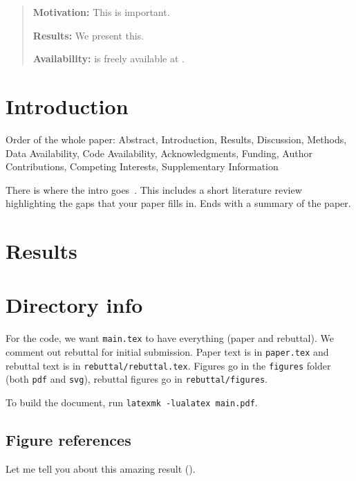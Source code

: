 \begin{refsegment}

\begin{abstract}
  \noindent \textbf{Motivation:} This is important.

  \noindent \textbf{Results:} We present this.

  \noindent \textbf{Availability:}  is freely available at \url{}.
\end{abstract}

\section*{Introduction}

Order of the whole paper: Abstract, Introduction, Results, Discussion, Methods,
Data Availability, Code Availability, Acknowledgments, Funding, Author
Contributions, Competing Interests, Supplementary Information

There is where the intro
goes~\autocite{schwartzTooManyCellsIdentifiesVisualizes2020}. This includes a
short literature review highlighting the gaps that your paper fills in. Ends
with a summary of the paper.

\section*{Results}

\section*{Directory info}

For the code, we want \texttt{main.tex} to have everything (paper and rebuttal).
We comment out rebuttal for initial submission. Paper text is in
\texttt{paper.tex} and rebuttal text is in \texttt{rebuttal/rebuttal.tex}.
Figures go in the \texttt{figures} folder (both \texttt{pdf} and \texttt{svg}),
rebuttal figures go in \texttt{rebuttal/figures}.

To build the document, run \texttt{latexmk -lualatex main.pdf}.

\subsection*{Figure references}

Let me tell you about this amazing result
().


\end{refsegment}
